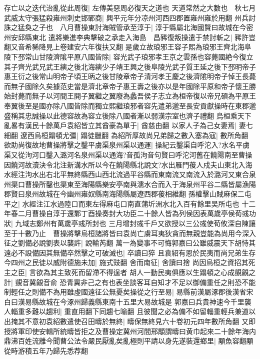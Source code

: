 存亡以之迭代治亂從此周復|{
	左傳美惡周必復天之道也}
天道常然之大數也　秋七月武威太守張猛殺雍州刺史邯鄲商|{
	興平元年分凉州河西四郡置雍州雍於用翻}
州兵討誅之猛奐之子也　八月曹操東討海賊管承至淳于|{
	淳于縣屬北海國賢曰故城在今密州安邱縣東北}
遣將樂進李典擊破之承走入海島　昌豨復叛操遣于禁討斬之|{
	豨許豈翻又音希豨降見上卷建安六年復扶又翻}
是歲立故琅邪王容子熙為琅邪王齊北海阜陵下邳常山甘陵濟隂平原八國皆除|{
	容光武子琅邪孝王京之雲孫也容薨國絶今復立其子齊光武兄武王縯之後北海縯少子靖王興之後阜陵光武子質王延之後下邳明帝子惠王衍之後常山明帝子頃王昞之後甘陵章帝子清河孝王慶之後濟隂明帝子悼王長薨而無子國除久矣據范史當是濟北章帝子惠王壽之後亦以是年國除平原和帝子懷王勝始封薨而無子以河間王開子翼繼之翼廢為蠡吾侯子志立為桓帝復以帝兄碩為平原王奉翼後至是國亦除八國皆除而獨立熙繼琅邪者容先遣弟邈至長安貢獻操時在東郡邈盛稱其忠誠操以此德容故為容立後除八國者漸以弱漢宗室也濟子禮翻}
烏桓乘天下亂畧有漢民十餘萬戶袁紹皆立其酋豪為單于|{
	酋慈由翻}
以家人子為己女妻焉|{
	妻七細翻}
遼西烏桓蹋頓尤彊|{
	蹋徒臘翻}
為紹所厚故尚兄弟歸之數入塞為寇|{
	數所角翻}
欲助尚復故地曹操將擊之鑿平虜渠泉州渠以通運|{
	操紀云鑿渠自呼沱入?水名平虜渠又從泃河口鑿入潞河名泉州渠以通海?音孤泃音句賢曰呼沱河舊在饒陽南至曹操因饒河故瀆決令北注新溝水所以今在饒陽縣北說文?水出雁門葰人戍夫山東北入海水經注泃水出右北平無終縣西山西北流過平谷縣而東南流又南流入於潞河又東合泉州渠口曹操所鑿也渠東至海陽縣樂安亭南與濡水合而入于海泉州平谷二縣皆屬漁陽郡賢曰泉州故城在今幽州雍奴縣南海陽縣屬遼西郡葰相維翻}
孫權擊山賊麻保二屯平之|{
	水經注江水過陸口而東左得麻屯口南直蒲圻洲水北入百有餘里吴所屯也}
十二年春二月曹操自淳于還鄴丁酉操奏封大功臣二十餘人皆為列侯因表萬歲亭侯荀彧功狀|{
	九域志鄭州有萬歲亭彧所封也}
三月增封彧千戶又欲授以三公彧使荀攸深自陳讓至于十數乃止　曹操將擊烏桓諸將皆曰袁尚亡虜耳夷狄貪而無親豈能為尚用今深入征之劉備必說劉表以襲許|{
	說輸芮翻}
萬一為變事不可悔郭嘉曰公雖威震天下胡恃其遠必不設備因其無備卒然擊之可破滅也|{
	卒讀曰猝}
且袁紹有恩於民夷而尚兄弟生存今四州之民徒以威附德施未加|{
	施式豉翻}
舍而南征|{
	舍讀曰捨}
尚因烏桓之資招其死主之臣|{
	言欲為其主致死而留滯不得逞者}
胡人一動民夷俱應以生蹋頓之心成覬覦之計|{
	覬音冀覦音俞}
恐青冀非己之有也表坐談客耳自知才不足以御備重任之則恐不能制輕任之則備不為用雖虛國遠征公無憂矣操從之行至易|{
	易縣前漢屬涿郡後漢省宋白曰漢易縣故城在今涿州歸義縣東南十五里大易故城是}
郭嘉曰兵貴神速今千里襲人輜重多難以趨利|{
	重直用翻下同趨七喻翻}
且彼聞之必為備不如留輜重輕兵兼道以出掩其不意初袁紹數遣使召田疇於無終|{
	疇保無終見六十卷初元四年數所角翻}
又即授將軍印使安輯所統疇皆拒之及曹操定冀州河間邢顒謂疇曰黄巾起來二十餘年海内鼎沸百姓流離今聞曹公法令嚴民厭亂矣亂極則平請以身先遂裝還鄉里|{
	顒魚容翻顒從畤游積五年乃歸先悉荐翻}
